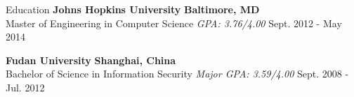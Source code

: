 \documentclass{resume} %
\begin{document}

\begin{rSection}{Education}
{\bf Johns Hopkins University} \hfill {\bf Baltimore, MD} \\
{Master of Engineering in Computer Science} {\em GPA: 3.76/4.00} \hfill {Sept. 2012 - May 2014}

{\bf Fudan University} \hfill {\bf Shanghai, China} \\
{Bachelor of Science in Information Security} {\em Major GPA: 3.59/4.00} \hfill {Sept. 2008 - Jul. 2012}
\end{rSection}


\end{document}
